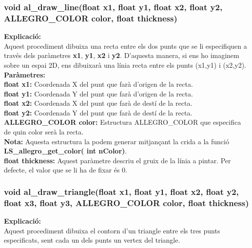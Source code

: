 \documentclass[11pt]{article}
\begin{document}
\subsubsection{void al\_draw\_line(float x1, float y1, float x2, float y2, ALLEGRO\_COLOR color, float thickness)}
\textbf{Explicació:}\\
Aquest procediment dibuixa una recta entre els dos punts que se li especifiquen a través dels paràmetres \textbf{x1}, \textbf{y1}, \textbf{x2} i \textbf{y2}. D'aquesta manera, si ens ho imaginem sobre un espai 2D, ens dibuixarà una línia recta entre els punts (x1,y1) i (x2,y2).\\

\noindent \textbf{Paràmetres:}\\
\textbf{float x1:} Coordenada X del punt que farà d'origen de la recta.\\
\textbf{float y1:} Coordenada Y del punt que farà d'origen de la recta.\\
\textbf{float x2:} Coordenada X del punt que farà de destí de la recta.\\
\textbf{float y2:} Coordenada Y del punt que farà de destí de la recta.\\
\textbf{ALLEGRO\_COLOR color:} Estructura ALLEGRO\_COLOR que especifica de quin color serà la recta.\\

\noindent \textbf{Nota:} Aquesta estructura la podem generar mitjançant la crida a la funció \textbf{ LS\_allegro\_get\_color( int nColor)}.\\

\noindent \textbf{float thickness:} Aquest paràmetre descriu el gruix de la línia a pintar. Per defecte, el valor que se li ha de fixar és 0.\\

\newpage		
\subsubsection{void al\_draw\_triangle(float x1, float y1, float x2, float y2, float x3, float y3, ALLEGRO\_COLOR color, float thickness)}
\textbf{Explicació:}\\
Aquest procediment dibuixa el contorn d'un triangle entre els tres punts especificats, sent cada un dels punts un vertex del triangle.\\
\end{document}
